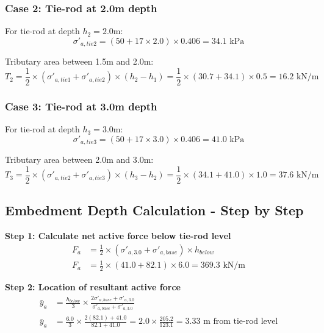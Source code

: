 \documentclass[10pt,a4paper,twocolumn]{article}
\begin{document}
\subsubsection{Case 2: Tie-rod at 2.0m depth}

For tie-rod at depth $h_2 = 2.0$m:
\begin{equation}
\sigma'_{a,tie2} = (50 + 17 \times 2.0) \times 0.406 = 34.1 \text{ kPa}
\end{equation}

Tributary area between 1.5m and 2.0m:
\begin{equation}
T_2 = \frac{1}{2} \times (\sigma'_{a,tie1} + \sigma'_{a,tie2}) \times (h_2 - h_1) = \frac{1}{2} \times (30.7 + 34.1) \times 0.5 = 16.2 \text{ kN/m}
\end{equation}

\subsubsection{Case 3: Tie-rod at 3.0m depth}

For tie-rod at depth $h_3 = 3.0$m:
\begin{equation}
\sigma'_{a,tie3} = (50 + 17 \times 3.0) \times 0.406 = 41.0 \text{ kPa}
\end{equation}

Tributary area between 2.0m and 3.0m:
\begin{equation}
T_3 = \frac{1}{2} \times (\sigma'_{a,tie2} + \sigma'_{a,tie3}) \times (h_3 - h_2) = \frac{1}{2} \times (34.1 + 41.0) \times 1.0 = 37.6 \text{ kN/m}
\end{equation}
\subsection{Embedment Depth Calculation - Step by Step}

\textbf{Step 1: Calculate net active force below tie-rod level}
\begin{align}
F_a &= \frac{1}{2} \times (\sigma'_{a,3.0} + \sigma'_{a,base}) \times h_{below} \\
F_a &= \frac{1}{2} \times (41.0 + 82.1) \times 6.0 = 369.3 \text{ kN/m}
\end{align}

\textbf{Step 2: Location of resultant active force}
\begin{align}
\bar{y}_a &= \frac{h_{below}}{3} \times \frac{2\sigma'_{a,base} + \sigma'_{a,3.0}}{\sigma'_{a,base} + \sigma'_{a,3.0}} \\
\bar{y}_a &= \frac{6.0}{3} \times \frac{2(82.1) + 41.0}{82.1 + 41.0} = 2.0 \times \frac{205.2}{123.1} = 3.33 \text{ m from tie-rod level}
\end{align}
\end{document}
